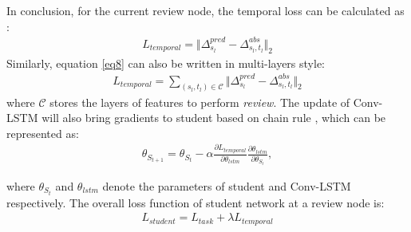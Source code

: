 \documentclass[letterpaper]{article} %
\begin{document}
In conclusion, for the current review node, the temporal loss can be calculated as :
\begin{align}
    L_{temporal} =  \Big\Vert \Delta_{s_{l}}^{pred} -\Delta^{abs}_{s_{l},t_{l}}\Big\Vert_{2}
    \label{eq8}
\end{align}
Similarly, equation \ref{eq8} can also be written in multi-layers style:
\begin{align}
    L_{temporal} = \sum_{(s_{l},t_{l})\in \mathcal{C}} \Big\Vert \Delta_{s_{l}}^{pred} -\Delta^{abs}_{s_{l},t_{l}}\Big\Vert_{2}
\end{align}
where $\mathcal{C}$ stores the layers of features to perform \emph{review}. The update of Conv-LSTM will also bring gradients to student based on chain rule , which can be represented as:
\begin{align}
    \theta_{S_{t+1}} = \theta_{S_{t}} - \alpha \frac{\partial L_{temporal}}{\partial \theta_{lstm}}\frac{\partial \theta_{lstm}}{\partial \theta_{S_{t}}},
\end{align}
 
 \noindent where $\theta_{S_{t}}$ and $\theta_{lstm}$ denote the parameters of student and Conv-LSTM respectively. The overall loss function of student network at a review node is:
\begin{align}
    L_{student} = L_{task} + \lambda L_{temporal}
\end{align}
\end{document}
